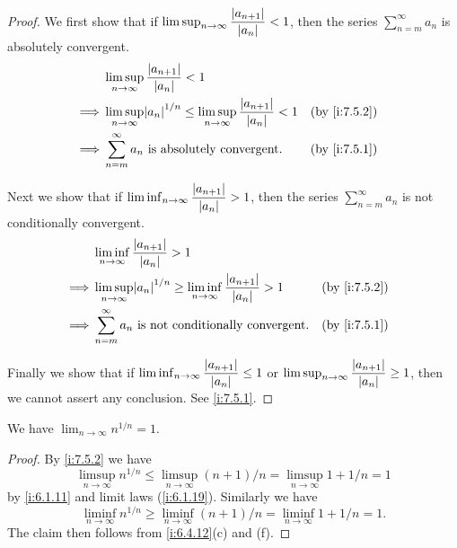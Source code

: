 \begin{proof}
  We first show that if \(\limsup_{n \to \infty} \dfrac{\left\lvert a_{n + 1}\right\rvert}{\left\lvert a_n\right\rvert} < 1\), then the series \(\sum_{n = m}^\infty a_n\) is absolutely convergent.
  \begin{align*}
             & \limsup_{n \to \infty} \dfrac{\abs{a_{n + 1}}}{\abs{a_n}} < 1                                                                 \\
    \implies & \limsup_{n \to \infty} \abs{a_n}^{1 / n} \leq \limsup_{n \to \infty} \dfrac{\abs{a_{n + 1}}}{\abs{a_n}} < 1 &  & \by{i:7.5.2} \\
    \implies & \sum_{n = m}^\infty a_n \text{ is absolutely convergent}.                                                   &  & \by{i:7.5.1}
  \end{align*}

  Next we show that if \(\liminf_{n \to \infty} \dfrac{\left\lvert a_{n + 1}\right\rvert}{\left\lvert a_n\right\rvert} > 1\), then the series \(\sum_{n = m}^\infty a_n\) is not conditionally convergent.
  \begin{align*}
             & \liminf_{n \to \infty} \dfrac{\abs{a_{n + 1}}}{\abs{a_n}} > 1                                                                 \\
    \implies & \limsup_{n \to \infty} \abs{a_n}^{1 / n} \geq \liminf_{n \to \infty} \dfrac{\abs{a_{n + 1}}}{\abs{a_n}} > 1 &  & \by{i:7.5.2} \\
    \implies & \sum_{n = m}^\infty a_n \text{ is not conditionally convergent}.                                            &  & \by{i:7.5.1}
  \end{align*}

  Finally we show that if \(\liminf_{n \to \infty} \dfrac{\left\lvert a_{n + 1}\right\rvert}{\left\lvert a_n\right\rvert} \leq 1\) or \(\limsup_{n \to \infty} \dfrac{\left\lvert a_{n + 1}\right\rvert}{\left\lvert a_n\right\rvert} \geq 1\), then we cannot assert any conclusion.
  See \cref{i:7.5.1}.
\end{proof}

\begin{prop}\label{i:7.5.4}
  We have \(\lim_{n \to \infty} n^{1 / n} = 1\).
\end{prop}

\begin{proof}
  By \cref{i:7.5.2} we have
  \[
    \limsup_{n \to \infty} n^{1 / n} \leq \limsup_{n \to \infty} (n + 1) / n = \limsup_{n \to \infty} 1 + 1 / n = 1
  \]
  by \cref{i:6.1.11} and limit laws (\cref{i:6.1.19}).
  Similarly we have
  \[
    \liminf_{n \to \infty} n^{1 / n} \geq \liminf_{n \to \infty} (n + 1) / n = \liminf_{n \to \infty} 1 + 1 / n = 1.
  \]
  The claim then follows from \cref{i:6.4.12}(c) and (f).
\end{proof}

